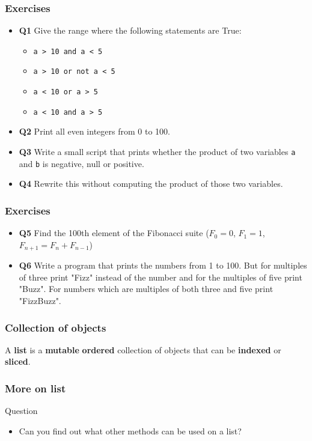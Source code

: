 \documentclass[xcolor=dvipsnames]{beamer}
\begin{document}
\begin{frame}
\frametitle{Exercises}
\begin{itemize}
\item \textbf{Q1} Give the range where the following statements are True:
\begin{itemize}
\item \texttt{a > 10 and a < 5}
\item \texttt{a > 10 or not a < 5}
\item \texttt{a < 10 or a > 5}
\item \texttt{a < 10 and a > 5}
\end{itemize}
\item \textbf{Q2} Print all even integers from 0 to 100.
\item \textbf{Q3} Write a small script that prints whether the product of two
variables \texttt{a} and \texttt{b} is negative, null or positive.
\item \textbf{Q4} Rewrite this without computing the product of those two
variables.
\end{itemize}
\end{frame}

\begin{frame}
\frametitle{Exercises}
\begin{itemize}
\item \textbf{Q5} Find the 100th element of the Fibonacci suite ($F_0 = 0$,
$F_1 = 1$, $F_{n + 1} = F_n + F_{n - 1}$)
\item \textbf{Q6}
Write a program that prints the numbers from 1 to 100. But for multiples of
three print "Fizz" instead of the number and for the multiples of five print
"Buzz". For numbers which are multiples of both three and five print
"FizzBuzz".
\end{itemize}
\end{frame}

\begin{frame}
\frametitle{Collection of objects}

A \textbf{list} is a \textbf{mutable} \textbf{ordered} collection of objects
that can be \textbf{indexed} or \textbf{sliced}.

\end{frame}

\begin{frame}
\frametitle{More on list}


\begin{alertblock}{Question}
\begin{itemize}
\item Can you find out what other methods can be used on a list? 
\end{itemize}
\end{alertblock}
\end{frame}
\end{document}

